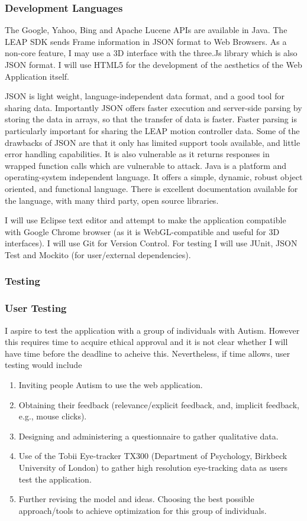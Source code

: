 \documentclass[a4paper, 10pt]{article}
\begin{document}
\subsubsection{Development Languages}
The Google, Yahoo, Bing and Apache Lucene APIs are available in Java. The LEAP SDK sends Frame information in JSON format to Web Browsers. As a non-core feature, I may use a 3D interface with the three.Js library which is also JSON format. I will use HTML5 for the development of the aesthetics of the Web Application itself.

JSON is light weight, language-independent data format, and a good tool for sharing data. Importantly JSON offers faster execution and server-side parsing by storing the data in arrays, so that the transfer of data is faster. Faster parsing is particularly important for sharing the LEAP motion controller data. Some of the drawbacks of JSON are that it only has limited support tools available, and little error handling capabilities. It is also vulnerable as it returns responses in wrapped function calls which are vulnerable to attack. Java is a platform and operating-system independent language. It offers a simple, dynamic, robust object oriented, and functional language. There is excellent documentation available for the language, with many third party, open source libraries.

I will use Eclipse text editor and attempt to make the application compatible with Google Chrome browser (as it is WebGL-compatible and useful for 3D interfaces). I will use Git for Version Control. For testing I will use JUnit, JSON Test and Mockito (for user/external dependencies).

\subsubsection{Testing}
\subsubsection{User Testing}
I aspire to test the application with a group of individuals with Autism. However this requires time to acquire ethical approval and it is not clear whether I will have time before the deadline to acheive this. Nevertheless, if time allows, user testing would include
\begin{enumerate}
\item Inviting people Autism to use the web application.
\item Obtaining their feedback (relevance/explicit feedback, and, implicit feedback, e.g., mouse clicks). 
\item Designing and administering a questionnaire to gather qualitative data. 
\item Use of the Tobii Eye-tracker TX300 (Department of Psychology, Birkbeck University of London) to gather high resolution eye-tracking data as users test the application. 
\item Further revising the model and ideas. Choosing the best possible approach/tools to achieve optimization for this group of individuals.
\end{enumerate}
\end{document}
